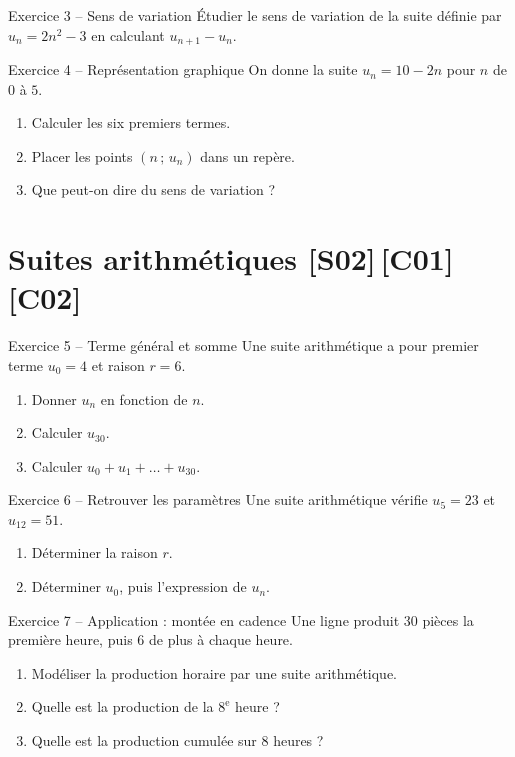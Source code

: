\documentclass[a4paper,11pt]{article}
\begin{document}
\begin{exo}{Exercice 3 -- Sens de variation}
Étudier le sens de variation de la suite définie par $u_n = 2n^2 - 3$ en calculant $u_{n+1} - u_n$.
\end{exo}

\begin{exo}{Exercice 4 -- Représentation graphique}
On donne la suite $u_n = 10 - 2n$ pour $n$ de $0$ à $5$.
\begin{enumerate}[label=\alph*)]
  \item Calculer les six premiers termes.
  \item Placer les points $(n\,;\,u_n)$ dans un repère.
  \item Que peut-on dire du sens de variation ?
\end{enumerate}
\end{exo}

\section{Suites arithmétiques \hfill {\normalsize\color{uimmred}[S02]\,[C01]\,[C02]}}

\begin{exo}{Exercice 5 -- Terme général et somme}
Une suite arithmétique a pour premier terme $u_0 = 4$ et raison $r = 6$.
\begin{enumerate}[label=\alph*)]
  \item Donner $u_n$ en fonction de $n$.
  \item Calculer $u_{30}$.
  \item Calculer $u_0 + u_1 + \dots + u_{30}$.
\end{enumerate}
\end{exo}

\begin{exo}{Exercice 6 -- Retrouver les paramètres}
Une suite arithmétique vérifie $u_5 = 23$ et $u_{12} = 51$.
\begin{enumerate}[label=\alph*)]
  \item Déterminer la raison $r$.
  \item Déterminer $u_0$, puis l'expression de $u_n$.
\end{enumerate}
\end{exo}

\begin{exo}{Exercice 7 -- Application : montée en cadence}
Une ligne produit $30$ pièces la première heure, puis $6$ de plus à chaque heure.
\begin{enumerate}[label=\alph*)]
  \item Modéliser la production horaire par une suite arithmétique.
  \item Quelle est la production de la $8^{\text{e}}$ heure ?
  \item Quelle est la production cumulée sur $8$ heures ?
\end{enumerate}
\end{exo}
\end{document}
